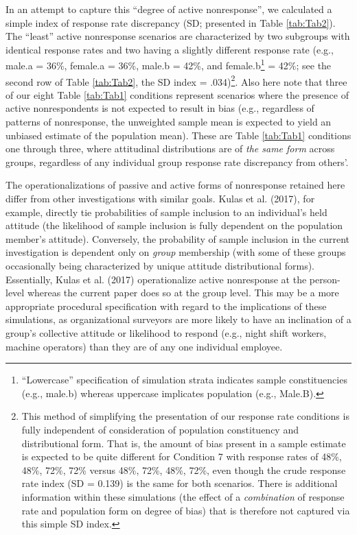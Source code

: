 \documentclass[
  man,mask]{apa7}
\begin{document}
In an attempt to capture this ``degree of active nonresponse'', we calculated a simple index of response rate discrepancy (SD; presented in Table \ref{tab:Tab2}). The ``least'' active nonresponse scenarios are characterized by two subgroups with identical response rates and two having a slightly different response rate (e.g., male.a = 36\%, female.a = 36\%, male.b = 42\%, and female.b\footnote{``Lowercase'' specification of simulation strata indicates sample constituencies (e.g., male.b) whereas uppercase implicates population (e.g., Male.B).} = 42\%; see the second row of Table \ref{tab:Tab2}, the SD index = .034)\footnote{This method of simplifying the presentation of our response rate conditions is fully independent of consideration of population constituency and distributional form. That is, the amount of bias present in a sample estimate is expected to be quite different for Condition 7 with response rates of 48\%, 48\%, 72\%, 72\% versus 48\%, 72\%, 48\%, 72\%, even though the crude response rate index (SD = 0.139) is the same for both scenarios. There is additional information within these simulations (the effect of a \emph{combination} of response rate and population form on degree of bias) that is therefore not captured via this simple SD index.}. Also here note that three of our eight Table \ref{tab:Tab1} conditions represent scenarios where the presence of active nonrespondents is not expected to result in bias (e.g., regardless of patterns of nonresponse, the unweighted sample mean is expected to yield an unbiased estimate of the population mean). These are Table \ref{tab:Tab1} conditions one through three, where attitudinal distributions are of \emph{the same form} across groups, regardless of any individual group response rate discrepancy from others'.

The operationalizations of passive and active forms of nonresponse retained here differ from other investigations with similar goals. Kulas et al. (2017), for example, directly tie probabilities of sample inclusion to an individual's held attitude (the likelihood of sample inclusion is fully dependent on the population member's attitude). Conversely, the probability of sample inclusion in the current investigation is dependent only on \emph{group} membership (with some of these groups occasionally being characterized by unique attitude distributional forms). Essentially, Kulas et al. (2017) operationalize active nonresponse at the person-level whereas the current paper does so at the group level. This may be a more appropriate procedural specification with regard to the implications of these simulations, as organizational surveyors are more likely to have an inclination of a group's collective attitude or likelihood to respond (e.g., night shift workers, machine operators) than they are of any one individual employee.
\end{document}
